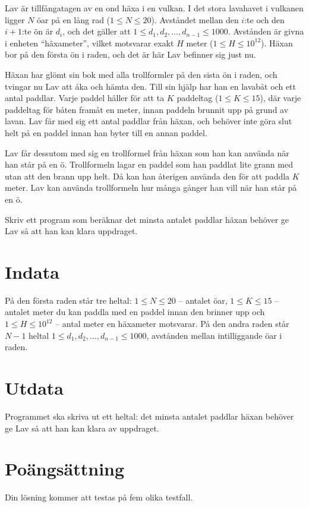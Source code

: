 Lav är tillfångatagen av en ond häxa i en vulkan. I det stora lavahavet i vulkanen ligger $N$ öar på en lång rad ($1 \le N \le 20$).
Avståndet mellan den $i$:te och den $i+1$:te ön är $d_i$, och det gäller att $1 \le d_1, d_2, \dots, d_{n-1} \le 1000$. Avstånden är givna i enheten ``häxameter'', vilket motsvarar exakt $H$ meter ($1 \le H \le 10^{12}$). Häxan bor på den första ön i raden, och det är här Lav befinner sig just nu.

Häxan har glömt sin bok med alla trollformler på den sista ön i raden, och tvingar nu Lav att åka och hämta den. Till sin hjälp har han en lavabåt och ett antal paddlar. 
Varje paddel håller för att ta $K$ paddeltag ($1 \le K \le 15$), där varje paddeltag för båten framåt en meter, innan paddeln brunnit upp på grund av lavan.
Lav får med sig ett antal paddlar från häxan, och behöver inte göra slut helt på en paddel innan han byter till en annan paddel.

Lav får dessutom med sig en trollformel från häxan som han kan använda när han står på en ö. Trollformeln lagar en paddel som han paddlat lite grann med utan att den brann upp helt.
Då kan han återigen använda den för att paddla $K$ meter. Lav kan använda trollformeln hur många gånger han vill när han står på en ö.

Skriv ett program som beräknar det minsta antalet paddlar häxan behöver ge Lav så att han kan klara uppdraget.

\section*{Indata}
På den första raden står tre heltal: $1 \le N \le 20$ -- antalet öar, $1 \le K \le 15$ -- antalet meter du kan paddla med en paddel innan den brinner upp och $1 \le H \le 10^{12}$ -- antal meter en häxameter motsvarar.
På den andra raden står $N-1$ heltal $1 \le d_1, d_2, \dots, d_{n-1} \le 1000$, avstånden mellan intilliggande öar i raden.

\section*{Utdata}
Programmet ska skriva ut ett heltal: det minsta antalet paddlar häxan behöver ge Lav så att han kan klara av uppdraget.

\section*{Poängsättning}
Din lösning kommer att testas på fem olika testfall.

